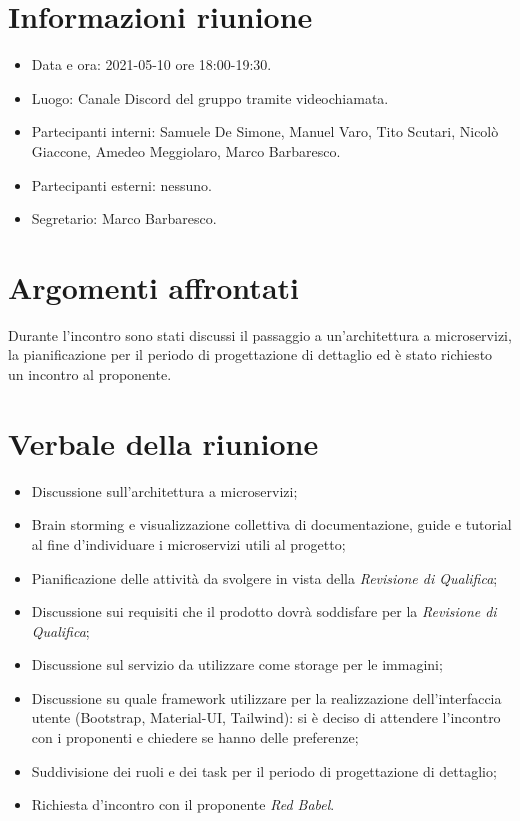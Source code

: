 \documentclass[a4paper]{article}
\begin{document}
\newpage
\tableofcontents
\newpage

\section{Informazioni riunione}
\begin{itemize}
    \item Data e ora: 2021-05-10 ore 18:00-19:30.
    \item Luogo: Canale Discord del gruppo tramite videochiamata.
    \item Partecipanti interni: Samuele De Simone, Manuel Varo, Tito Scutari, Nicolò Giaccone, Amedeo Meggiolaro, Marco Barbaresco.
    \item Partecipanti esterni: nessuno.
    \item Segretario: Marco Barbaresco.
\end{itemize}
\section{Argomenti affrontati}
Durante l'incontro sono stati discussi il passaggio a un'architettura a microservizi, la pianificazione per il periodo di progettazione di dettaglio ed è stato
richiesto un incontro al proponente.
\section{Verbale della riunione}
\begin{itemize}
    \item Discussione sull'architettura a microservizi;
    \item Brain storming e visualizzazione collettiva di documentazione, guide e tutorial al fine d'individuare i microservizi utili al progetto;
    \item Pianificazione delle attività da svolgere in vista della \textit{Revisione di Qualifica};
    \item Discussione sui requisiti che il prodotto dovrà soddisfare per la \textit{Revisione di Qualifica};
    \item Discussione sul servizio da utilizzare come storage per le immagini;
    \item Discussione su quale framework utilizzare per la realizzazione dell'interfaccia utente (Bootstrap, Material-UI, Tailwind):
          si è deciso di attendere l'incontro con i proponenti e chiedere se hanno delle preferenze;
    \item Suddivisione dei ruoli e dei task per il periodo di progettazione di dettaglio;
    \item Richiesta d'incontro con il proponente \textit{Red Babel}.
\end{itemize}
\newpage
\end{document}
